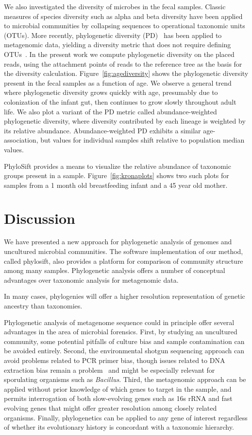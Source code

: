 \documentclass[10pt]{article}
\begin{document}
We also investigated the diversity of microbes in the fecal samples.
Classic measures of species diversity such as alpha and beta diversity have been applied to microbial communities by collapsing sequences to operational taxonomic units (OTUs).
More recently, phylogenetic diversity (PD)~\cite{Faith1992} has been applied to metagenomic data, yielding a diversity metric that does not require defining OTUs~\cite{Kembel2011}.
In the present work we compute phylogenetic diversity on the placed reads, using the attachment points of reads to the reference tree as the basis for the diversity calculation.
Figure~\ref{fig:agediversity} shows the phylogenetic diversity present in the fecal samples as a function of age.
We observe a general trend where phylogenetic diversity grows quickly with age, presumably due to colonization of the infant gut, then continues to grow slowly throughout adult life.
We also plot a variant of the PD metric called abundance-weighted phylogenetic diversity, where diversity contributed by each lineage is weighted by its relative abundance.
Abundance-weighted PD exhibits a similar age-association, but values for individual samples shift relative to population median values.

PhyloSift provides a means to visualize the relative abundance of taxonomic groups present in a sample.
Figure~\ref{fig:kronaplots} shows two such plots for samples from a 1 month old breastfeeding infant and a 45 year old mother.



\section*{Discussion}
We have presented a new approach for phylogenetic analysis of genomes and uncultured microbial communities.
The software implementation of our method, called phylosift, also provides a platform for comparison of community structure among many samples.
Phylogenetic analysis offers a number of conceptual advantages over taxonomic analysis for metagenomic data.

In many cases, phylogenies will offer a higher resolution representation of genetic ancestry than taxonomies.


Phylogenetic analysis of metagenome sequence could in principle offer several advantages in the area of microbial forensics.
First, by studying an uncultured community, some potential pitfalls of culture bias and sample contamination can be avoided entirely.
Second, the environmental shotgun sequencing approach can avoid problems related to PCR primer bias, though issues related to DNA extraction bias remain a problem~\cite{Morgan2010} and might be especially relevant for sporulating organisms such as \textit{Bacillus}. 
Third, the metagenomic approach can be applied without prior knowledge of which genes to target in the sample, and permits interrogation of both slow-evolving genes such as 16s rRNA and fast evolving genes that might offer greater resolution among closely related organisms.
Finally, phylogenetics can be applied to any gene of interest regardless of whether its evolutionary history is concordant with a taxonomic hierarchy.
\end{document}
